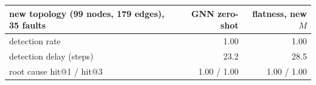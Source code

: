 \begin{center}\small\begin{tabular}{@{}lrr@{}}\toprule new topology (99 nodes, 179 edges), 35 faults & GNN zero-shot & flatness, new $M$ \\ \midrule
detection rate & 1.00 & 1.00 \\
detection delay (steps) & 23.2 & 28.5 \\
root cause hit@1 / hit@3 & 1.00 / 1.00 & 1.00 / 1.00 \\
\bottomrule\end{tabular}\end{center}
